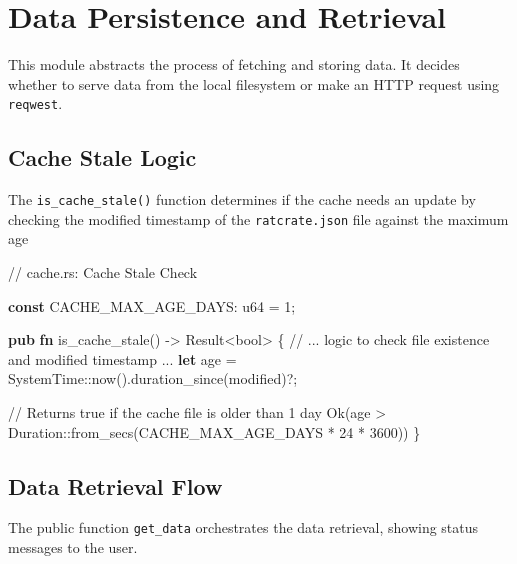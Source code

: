 \documentclass[
  letterpaper,
  DIV=11,
  numbers=noendperiod]{scrreprt}
\newenvironment{Shaded}{\begin{snugshade}}{\end{snugshade}}
\newcommand{\CommentTok}[1]{\textcolor[rgb]{0.37,0.37,0.37}{#1}}
\newcommand{\ConstantTok}[1]{\textcolor[rgb]{0.56,0.35,0.01}{#1}}
\newcommand{\DataTypeTok}[1]{\textcolor[rgb]{0.68,0.00,0.00}{#1}}
\newcommand{\DecValTok}[1]{\textcolor[rgb]{0.68,0.00,0.00}{#1}}
\newcommand{\KeywordTok}[1]{\textcolor[rgb]{0.00,0.23,0.31}{\textbf{#1}}}
\newcommand{\NormalTok}[1]{\textcolor[rgb]{0.00,0.23,0.31}{#1}}
\newcommand{\OperatorTok}[1]{\textcolor[rgb]{0.37,0.37,0.37}{#1}}
\newcommand{\PreprocessorTok}[1]{\textcolor[rgb]{0.68,0.00,0.00}{#1}}
\begin{document}
\section{Data Persistence and
Retrieval}\label{data-persistence-and-retrieval}

This module abstracts the process of fetching and storing data. It
decides whether to serve data from the local filesystem or make an HTTP
request using \texttt{reqwest}.

\subsection{Cache Stale Logic}\label{cache-stale-logic}

The \texttt{is\_cache\_stale()} function determines if the cache needs
an update by checking the modified timestamp of the
\texttt{ratcrate.json} file against the maximum age

\begin{Shaded}
\begin{Highlighting}[]
\CommentTok{// cache.rs: Cache Stale Check}

\KeywordTok{const}\NormalTok{ CACHE\_MAX\_AGE\_DAYS}\OperatorTok{:} \DataTypeTok{u64} \OperatorTok{=} \DecValTok{1}\OperatorTok{;}

\KeywordTok{pub} \KeywordTok{fn}\NormalTok{ is\_cache\_stale() }\OperatorTok{{-}\textgreater{}} \DataTypeTok{Result}\OperatorTok{\textless{}}\DataTypeTok{bool}\OperatorTok{\textgreater{}} \OperatorTok{\{}
    \CommentTok{// ... logic to check file existence and modified timestamp ...}
    \KeywordTok{let}\NormalTok{ age }\OperatorTok{=} \PreprocessorTok{SystemTime::}\NormalTok{now()}\OperatorTok{.}\NormalTok{duration\_since(modified)}\OperatorTok{?;}
    
    \CommentTok{// Returns true if the cache file is older than 1 day}
    \ConstantTok{Ok}\NormalTok{(age }\OperatorTok{\textgreater{}} \PreprocessorTok{Duration::}\NormalTok{from\_secs(CACHE\_MAX\_AGE\_DAYS }\OperatorTok{*} \DecValTok{24} \OperatorTok{*} \DecValTok{3600}\NormalTok{))}
\OperatorTok{\}}
\end{Highlighting}
\end{Shaded}

\subsection{Data Retrieval Flow}\label{data-retrieval-flow}

The public function \texttt{get\_data} orchestrates the data retrieval,
showing status messages to the user.
\end{document}
